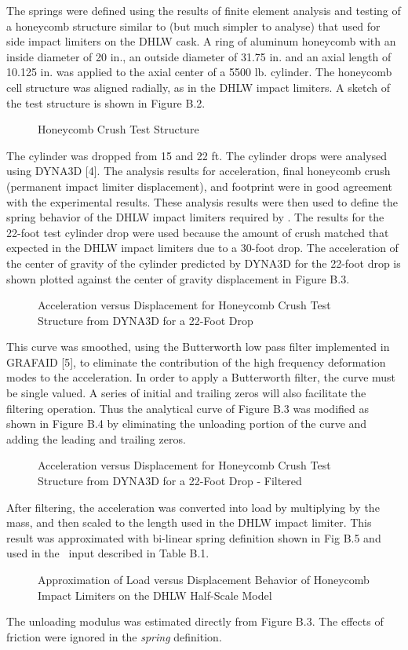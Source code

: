    The springs were defined using the results of finite element
analysis and testing of a honeycomb structure similar to
(but much simpler to analyse) that used for
side impact limiters on the DHLW cask.  A ring of aluminum honeycomb
with an inside diameter of 20 in., an outside diameter of 31.75 in. and
an axial length of 10.125 in. was applied to the axial center of a
5500 lb. cylinder. The honeycomb cell structure
was aligned radially, as
in the DHLW impact limiters.  A
sketch of the test structure is shown in Figure B.2.
\begin{figure}
\vspace{3.5 in}
\caption{Honeycomb Crush Test Structure}
\end{figure}
The cylinder was
dropped from 15 and 22 ft.  The cylinder drops were analysed using
DYNA3D [4].  The analysis results for acceleration, final honeycomb
crush (permanent impact limiter displacement), and footprint were in
good agreement with the experimental results. These analysis results
were then used to define the spring behavior of the DHLW impact
limiters required by \SLAP .  The results for the 22-foot test
cylinder drop were
used because the amount of crush matched that expected in the
DHLW impact limiters due to a 30-foot drop.
The acceleration of the
center of gravity of the cylinder predicted by DYNA3D for the 22-foot
drop is shown plotted against the center of gravity displacement in
Figure B.3.
\begin{figure}
\vspace{3.5 in}
\caption{Acceleration versus Displacement for Honeycomb Crush Test
Structure from DYNA3D for a 22-Foot Drop}
\end{figure}
This curve was smoothed, using the Butterworth low pass
filter implemented in GRAFAID [5],
to eliminate the contribution of the high frequency deformation
modes to the acceleration.  In order to apply a Butterworth filter,
the curve must be single valued.
A series of
initial and trailing zeros will also facilitate the filtering
operation.
Thus the analytical curve of Figure B.3
was modified as shown in Figure B.4 by eliminating the unloading
portion of the curve and adding the leading and trailing zeros.
\begin{figure}
\vspace{3.5 in}
\caption{Acceleration versus Displacement for Honeycomb Crush Test
Structure from DYNA3D for a 22-Foot Drop - Filtered}
\end{figure}
After filtering, the acceleration was converted into load
by multiplying by the mass, and then scaled to the length used in the
DHLW impact limiter. This result was approximated with bi-linear
spring definition shown in Fig B.5 and used in the \SLAP\ input
described in Table B.1.
\begin{figure}
\vspace{3.5 in}
\caption{Approximation of Load versus Displacement Behavior of
Honeycomb Impact Limiters on the DHLW Half-Scale Model}
\end{figure}
The unloading modulus was estimated directly
from Figure B.3. The effects of friction were ignored in the {\em
spring} definition.

